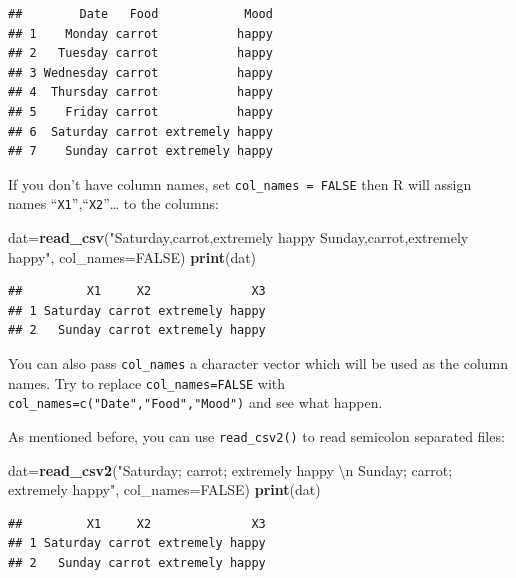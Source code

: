 \documentclass[]{book}
\newenvironment{Shaded}{\begin{snugshade}}{\end{snugshade}}
\newcommand{\KeywordTok}[1]{\textcolor[rgb]{0.13,0.29,0.53}{\textbf{{#1}}}}
\newcommand{\DataTypeTok}[1]{\textcolor[rgb]{0.13,0.29,0.53}{{#1}}}
\newcommand{\CharTok}[1]{\textcolor[rgb]{0.31,0.60,0.02}{{#1}}}
\newcommand{\StringTok}[1]{\textcolor[rgb]{0.31,0.60,0.02}{{#1}}}
\newcommand{\OtherTok}[1]{\textcolor[rgb]{0.56,0.35,0.01}{{#1}}}
\newcommand{\NormalTok}[1]{{#1}}
\theoremstyle{definition}
\theoremstyle{definition}
\theoremstyle{remark}
\begin{document}
\begin{verbatim}
##        Date   Food            Mood
## 1    Monday carrot           happy
## 2   Tuesday carrot           happy
## 3 Wednesday carrot           happy
## 4  Thursday carrot           happy
## 5    Friday carrot           happy
## 6  Saturday carrot extremely happy
## 7    Sunday carrot extremely happy
\end{verbatim}

If you don't have column names, set \texttt{col\_names\ =\ FALSE} then R
will assign names ``\texttt{X1}'',``\texttt{X2}''\ldots{} to the
columns:

\begin{Shaded}
\begin{Highlighting}[]
\NormalTok{dat=}\KeywordTok{read_csv}\NormalTok{(}\StringTok{"Saturday,carrot,extremely happy}
\StringTok{          Sunday,carrot,extremely happy"}\NormalTok{, }\DataTypeTok{col_names=}\OtherTok{FALSE}\NormalTok{)}
\KeywordTok{print}\NormalTok{(dat)}
\end{Highlighting}
\end{Shaded}

\begin{verbatim}
##         X1     X2              X3
## 1 Saturday carrot extremely happy
## 2   Sunday carrot extremely happy
\end{verbatim}

You can also pass \texttt{col\_names} a character vector which will be
used as the column names. Try to replace \texttt{col\_names=FALSE} with
\texttt{col\_names=c("Date","Food","Mood")} and see what happen.

As mentioned before, you can use \texttt{read\_csv2()} to read semicolon
separated files:

\begin{Shaded}
\begin{Highlighting}[]
\NormalTok{dat=}\KeywordTok{read_csv2}\NormalTok{(}\StringTok{"Saturday; carrot; extremely happy }\CharTok{\textbackslash{}n}\StringTok{ Sunday; carrot; extremely happy"}\NormalTok{, }\DataTypeTok{col_names=}\OtherTok{FALSE}\NormalTok{)}
\KeywordTok{print}\NormalTok{(dat)}
\end{Highlighting}
\end{Shaded}

\begin{verbatim}
##         X1     X2              X3
## 1 Saturday carrot extremely happy
## 2   Sunday carrot extremely happy
\end{verbatim}
\end{document}
